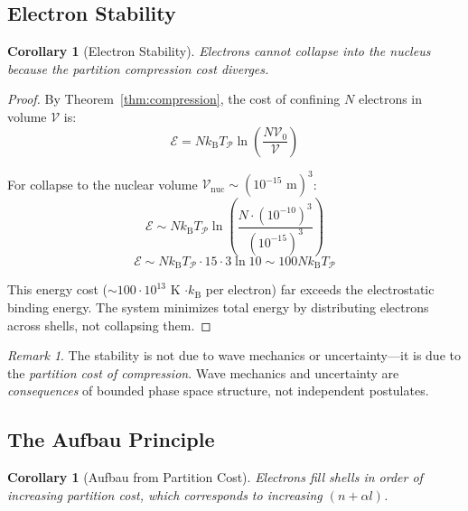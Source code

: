 \documentclass[twocolumn,10pt,a4paper]{article}
\newtheorem{corollary}[theorem]{Corollary}
\theoremstyle{definition}
\theoremstyle{remark}
\newtheorem{remark}[theorem]{Remark}
\newcommand{\kB}{k_{\mathrm{B}}}
\newcommand{\Partition}{\mathcal{P}}
\newcommand{\Cost}{\mathcal{E}}
\begin{document}
\subsection{Electron Stability}

\begin{corollary}[Electron Stability]
\label{cor:electron_stability}
Electrons cannot collapse into the nucleus because the partition compression cost diverges.
\end{corollary}

\begin{proof}
By Theorem~\ref{thm:compression}, the cost of confining $N$ electrons in volume $\mathcal{V}$ is:
\begin{equation}
    \Cost = N\kB T_{\Partition} \ln\left(\frac{N\mathcal{V}_0}{\mathcal{V}}\right)
\end{equation}

For collapse to the nuclear volume $\mathcal{V}_{\text{nuc}} \sim (10^{-15} \text{ m})^3$:
\begin{equation}
    \Cost \sim N\kB T_{\Partition} \ln\left(\frac{N \cdot (10^{-10})^3}{(10^{-15})^3}\right)
\end{equation}
\begin{equation}
    \Cost \sim N\kB T_{\Partition} \cdot 15 \cdot 3 \ln 10 \sim 100 N\kB T_{\Partition}
\end{equation}

This energy cost ($\sim 100 \cdot 10^{13}$ K $\cdot \kB$ per electron) far exceeds the electrostatic binding energy. The system minimizes total energy by distributing electrons across shells, not collapsing them.
\end{proof}

\begin{remark}
The stability is not due to wave mechanics or uncertainty---it is due to the \emph{partition cost of compression}. Wave mechanics and uncertainty are \emph{consequences} of bounded phase space structure, not independent postulates.
\end{remark}

\subsection{The Aufbau Principle}

\begin{corollary}[Aufbau from Partition Cost]
\label{cor:aufbau}
Electrons fill shells in order of increasing partition cost, which corresponds to increasing $(n + \alpha l)$.
\end{corollary}
\end{document}
